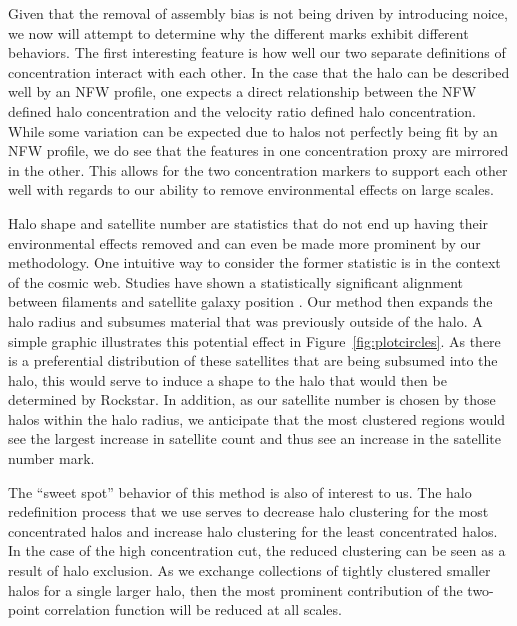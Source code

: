 \documentclass[usenatbib,usegraphicx,letterpaper]{mn2e}
\begin{document}
Given that the removal of assembly bias is not being driven by introducing noice, we now will attempt to determine why the different marks exhibit different behaviors. The first interesting feature is how well our two separate definitions of concentration interact with each other. In the case that the halo can be described well by an NFW profile, one expects a direct relationship between the NFW defined halo concentration and the velocity ratio defined halo concentration. While some variation can be expected due to halos not perfectly being fit by an NFW profile, we do see that the features in one concentration proxy are mirrored in the other. This allows for the two concentration markers to support each other well with regards to our ability to remove environmental effects on large scales.

Halo shape and satellite number are statistics that do not end up having their environmental effects removed and can even be made more prominent by our methodology. One intuitive way to consider the former statistic is in the context of the cosmic web. Studies have shown a statistically significant alignment between filaments and satellite galaxy position \citep{tempel15, velliscig15}. Our method then expands the halo radius and subsumes material that was previously outside of the halo. A simple graphic illustrates this potential effect in Figure~\ref{fig:plotcircles}. As there is a preferential distribution of these satellites that are being subsumed into the halo, this would serve to induce a shape to the halo that would then be determined by Rockstar. In addition, as our satellite number is chosen by those halos within the halo radius, we anticipate that the most clustered regions would see the largest increase in satellite count and thus see an increase in the satellite number mark.

The ``sweet spot'' behavior of this method is also of interest to us. The halo redefinition process that we use serves to decrease halo clustering for the most concentrated halos and increase halo clustering for the least concentrated halos. In the case of the high concentration cut, the reduced clustering can be seen as a result of halo exclusion. As we exchange collections of tightly clustered smaller halos for a single larger halo, then the most prominent contribution of the two-point correlation function will be reduced at all scales.
\end{document}
